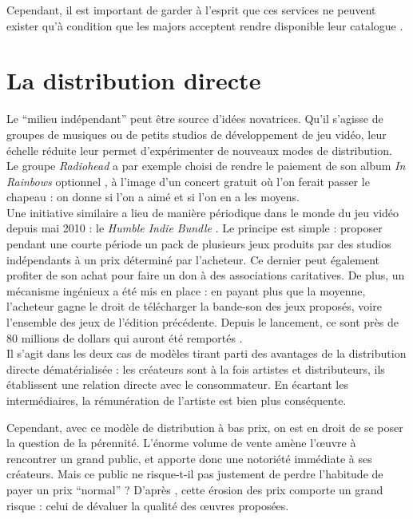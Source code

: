 \documentclass[a4paper]{report}
\begin{document}
	Cependant, il est important de garder à l'esprit que ces services ne peuvent exister qu'à condition que les majors acceptent rendre disponible leur catalogue \cite{podcast-industrie-musicale}.

	\section{La distribution directe}
	Le ``milieu indépendant'' peut être source d'idées novatrices. Qu'il s'agisse de groupes de musiques ou de petits studios de développement de jeu vidéo, leur échelle réduite leur permet d'expérimenter de nouveaux modes de distribution.\\

	Le groupe \emph{Radiohead} a par exemple choisi de rendre le paiement de son album \emph{In Rainbows} optionnel \cite{radiohead}, à l'image d'un concert gratuit où l'on ferait passer le chapeau : on donne si l'on a aimé et si l'on en a les moyens.\\

	Une initiative similaire a lieu de manière périodique dans le monde du jeu vidéo depuis mai 2010 : le \emph{Humble Indie Bundle} \cite{humble-indie-bundle}. Le principe est simple : proposer pendant une courte période un pack de plusieurs jeux produits par des studios indépendants à un prix déterminé par l'acheteur. Ce dernier peut également profiter de son achat pour faire un don à des associations caritatives. De plus, un mécanisme ingénieux a été mis en place : en payant plus que la moyenne, l'acheteur gagne le droit de télécharger la bande-son des jeux proposés, voire l'ensemble des jeux de l'édition précédente. Depuis le lancement, ce sont près de 80 millions de dollars qui auront été remportés \cite{humble-stats}.\\

	Il s'agit dans les deux cas de modèles tirant parti des avantages de la distribution directe dématérialisée : les créateurs sont à la fois artistes et distributeurs, ils établissent une relation directe avec le consommateur. En écartant les intermédiaires, la rémunération de l'artiste est bien plus conséquente.

	Cependant, avec ce modèle de distribution à bas prix, on est en droit de se poser la question de la pérennité. L'énorme volume de vente amène l’œuvre à rencontrer un grand public, et apporte donc une notoriété immédiate à ses créateurs. Mais ce public ne risque-t-il pas justement de perdre l'habitude de payer un prix ``normal'' ? D'après \cite{low-prices-low-expectations}, cette érosion des prix comporte un grand risque : celui de dévaluer la qualité des œuvres proposées.
\end{document}
